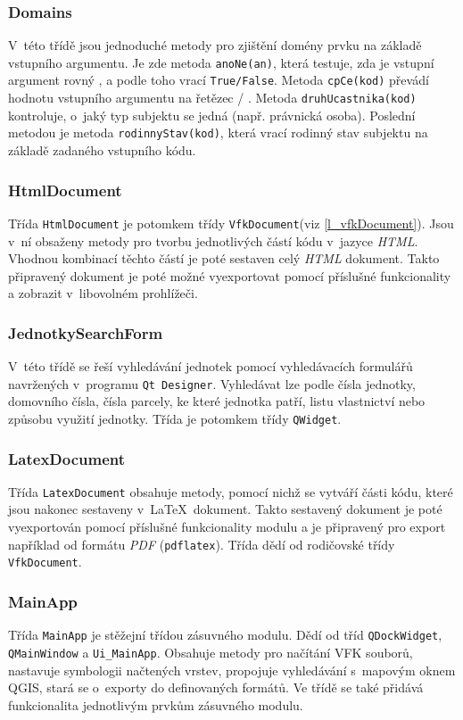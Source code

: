\documentclass[a4paper,12pt,oneside]{book}
\newcommand{\latex}{\LaTeX}
\begin{document}
\subsubsection{Domains}
V~této třídě jsou jednoduché metody pro zjištění domény prvku na základě vstupního argumentu. Je zde metoda \texttt{anoNe(an)}, která testuje, zda je vstupní argument rovný , a podle toho vrací \texttt{True/False}. Metoda \texttt{cpCe(kod)} převádí hodnotu vstupního argumentu na řetězec  / . Metoda \texttt{druhUcastnika(kod)} kontroluje, o~jaký typ subjektu se jedná (např. právnická osoba). Poslední metodou je metoda \texttt{rodinnyStav(kod)}, která vrací rodinný stav subjektu na základě zadaného vstupního kódu.

\subsubsection{HtmlDocument}
Třída \texttt{HtmlDocument} je potomkem třídy \texttt{VfkDocument}(viz \ref{l_vfkDocument}). Jsou v~ní obsaženy metody pro tvorbu jednotlivých částí kódu v~jazyce \textit{HTML}. Vhodnou kombinací těchto částí je poté sestaven celý \textit{HTML} dokument. Takto připravený dokument je poté možné vyexportovat pomocí příslušné funkcionality a zobrazit v~libovolném prohlížeči.

\subsubsection{JednotkySearchForm}
V~této třídě se řeší vyhledávání jednotek pomocí vyhledávacích formulářů navržených v~programu \texttt{Qt Designer}. Vyhledávat lze podle čísla jednotky, domovního čísla, čísla parcely, ke které jednotka patří, listu vlastnictví nebo způsobu využití jednotky. Třída je potomkem třídy \texttt{QWidget}.

\subsubsection{LatexDocument}
Třída \texttt{LatexDocument} obsahuje metody, pomocí nichž se vytváří části kódu, které jsou nakonec sestaveny v~\latex~dokument. Takto sestavený dokument je poté vyexportován pomocí příslušné funkcionality modulu a je připravený pro export například od formátu \textit{PDF} (\texttt{pdflatex}). Třída dědí od rodičovské třídy \texttt{VfkDocument}. 

\subsubsection{MainApp}
Třída \texttt{MainApp} je stěžejní třídou zásuvného modulu. Dědí od tříd \texttt{QDockWidget}, \texttt{QMainWindow} a \texttt{Ui\_MainApp}. Obsahuje metody pro načítání VFK souborů, nastavuje symbologii načtených vrstev, propojuje vyhledávání s~mapovým oknem QGIS, stará se o~exporty do definovaných formátů. Ve třídě se také přidává funkcionalita jednotlivým prvkům zásuvného modulu.
\end{document}
